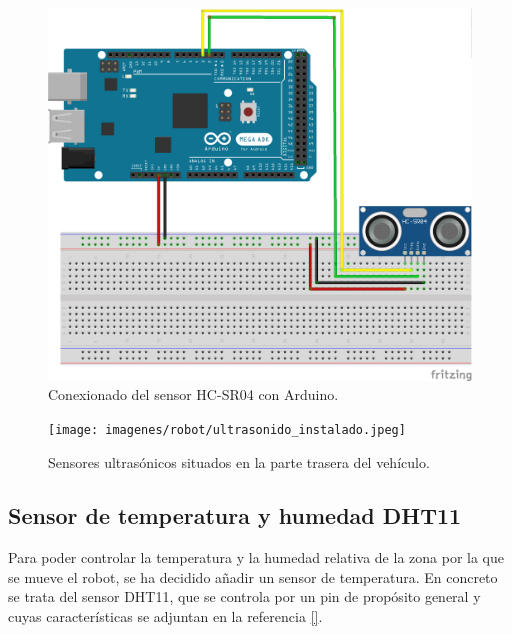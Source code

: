 \begin{figure}[H]
  \begin{center}
    \includegraphics[scale=0.6]{imagenes/conexionado_ultrasonido.png}
  \end{center}
  \caption{Conexionado del sensor HC-SR04 con Arduino.}
  \label{figura:sensor_HC-SR04_conexionado}
\end{figure}


 \begin{figure}[H]
  \begin{center}
    \texttt{[image: imagenes/robot/ultrasonido\_instalado.jpeg]}
  \end{center}
  \caption{Sensores ultrasónicos situados en la parte trasera del vehículo.}
  \label{figura:sensor_mq_2_potenciometro}
\end{figure}

\subsection{Sensor de temperatura y humedad DHT11}
\label{sec:dth11}


Para poder controlar la temperatura y la humedad relativa de la zona por la que se mueve el
robot, se ha decidido añadir un sensor de temperatura. En concreto se trata del sensor DHT11, que
se controla por un pin de propósito general y cuyas características se adjuntan en la referencia \ref{}.

